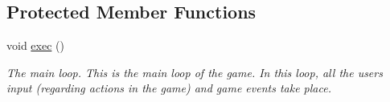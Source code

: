 \subsection*{Protected Member Functions}
\begin{DoxyCompactItemize}
\item 
\mbox{\label{classgame_af1ca264f9c412dc05d7e1d4cfcb3dac2}} 
void \mbox{\hyperlink{classgame_af1ca264f9c412dc05d7e1d4cfcb3dac2}{exec}} ()
\begin{DoxyCompactList}\small\item\em The main loop. This is the main loop of the game. In this loop, all the user\textquotesingle{}s input (regarding actions in the game) and game events take place. \end{DoxyCompactList}\end{DoxyCompactItemize}
